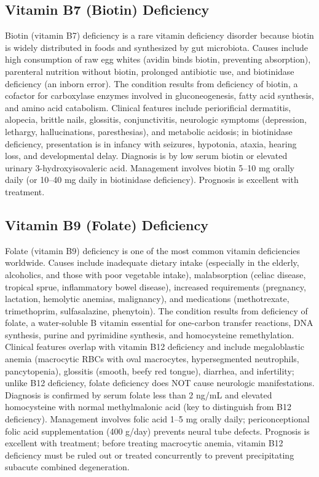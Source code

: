 \subsection{Vitamin B7 (Biotin) Deficiency}
\label{sec:Vitamin B7 Deficiency}
Biotin (vitamin B7) deficiency is a rare vitamin deficiency disorder because biotin is widely distributed in foods and synthesized by gut microbiota. Causes include high consumption of raw egg whites (avidin binds biotin, preventing absorption), parenteral nutrition without biotin, prolonged antibiotic use, and biotinidase deficiency (an inborn error). The condition results from deficiency of biotin, a cofactor for carboxylase enzymes involved in gluconeogenesis, fatty acid synthesis, and amino acid catabolism. Clinical features include periorificial dermatitis, alopecia, brittle nails, glossitis, conjunctivitis, neurologic symptoms (depression, lethargy, hallucinations, paresthesias), and metabolic acidosis; in biotinidase deficiency, presentation is in infancy with seizures, hypotonia, ataxia, hearing loss, and developmental delay. Diagnosis is by low serum biotin or elevated urinary 3-hydroxyisovaleric acid. Management involves biotin 5--10 mg orally daily (or 10--40 mg daily in biotinidase deficiency). Prognosis is excellent with treatment.

\subsection{Vitamin B9 (Folate) Deficiency}
\label{sec:Vitamin B9 Deficiency}
Folate (vitamin B9) deficiency is one of the most common vitamin deficiencies worldwide. Causes include inadequate dietary intake (especially in the elderly, alcoholics, and those with poor vegetable intake), malabsorption (celiac disease, tropical sprue, inflammatory bowel disease), increased requirements (pregnancy, lactation, hemolytic anemias, malignancy), and medications (methotrexate, trimethoprim, sulfasalazine, phenytoin). The condition results from deficiency of folate, a water-soluble B vitamin essential for one-carbon transfer reactions, DNA synthesis, purine and pyrimidine synthesis, and homocysteine remethylation. Clinical features overlap with vitamin B12 deficiency and include megaloblastic anemia (macrocytic RBCs with oval macrocytes, hypersegmented neutrophils, pancytopenia), glossitis (smooth, beefy red tongue), diarrhea, and infertility; unlike B12 deficiency, folate deficiency does NOT cause neurologic manifestations. Diagnosis is confirmed by serum folate less than 2 ng/mL and elevated homocysteine with normal methylmalonic acid (key to distinguish from B12 deficiency). Management involves folic acid 1--5 mg orally daily; periconceptional folic acid supplementation (400 \textmu g/day) prevents neural tube defects. Prognosis is excellent with treatment; before treating macrocytic anemia, vitamin B12 deficiency must be ruled out or treated concurrently to prevent precipitating subacute combined degeneration.

